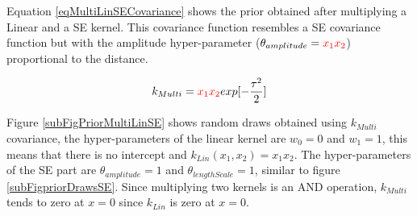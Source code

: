 Equation \ref{eqMultiLinSECovariance} shows the prior obtained after multiplying a Linear and a SE kernel. This covariance function resembles a SE covariance function but with the amplitude hyper-parameter ($\theta_{amplitude} = \textcolor{red}{x_{1}x_{2}}$) proportional to the  distance. 

\begin{equation}\label{eqMultiLinSECovariance}
k_{Multi} = \textcolor{red}{x_{1}x_{2}} exp[- \frac{\tau^2}{2}]
\end{equation}

Figure \ref{subFigPriorMultiLinSE} shows random draws obtained using $k_{Multi}$ covariance,  the hyper-parameters of the linear kernel are $w_{0}=0$ and $w_{1}=1$, this means that there is no intercept and $k_{Lin}(x_{1}, x_{2}) = x_{1}x_{2}$. The hyper-parameters of the SE part are $\theta_{amplitude}=1$ and $\theta_{lengthScale}=1$, similar to figure \ref{subFigpriorDrawsSE}. Since multiplying two kernels is an AND operation, $k_{Multi}$ tends to zero at $x=0$ since $k_{Lin}$ is zero at $x=0$. 

